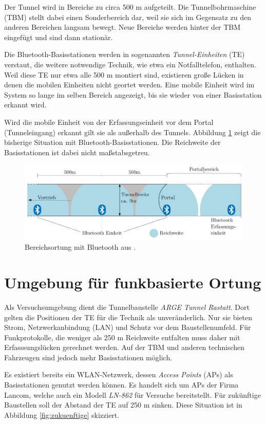 Der Tunnel wird in Bereiche zu circa 500 m aufgeteilt.
Die Tunnelbohrmaschine (TBM) stellt dabei einen Sonderbereich dar, weil sie sich im Gegensatz zu den anderen Bereichen langsam bewegt.
Neue Bereiche werden hinter der TBM eingefügt und sind dann stationär.

Die Bluetooth-Basisstationen werden in sogenannten \emph{Tunnel-Einheiten} (TE) verstaut, die weitere notwendige Technik, wie etwa ein Notfalltelefon, enthalten.
Weil diese TE nur etwa alle 500 m montiert sind, existieren große Lücken in denen die mobilen Einheiten nicht geortet werden.
Eine mobile Einheit wird im System so lange im selben Bereich angezeigt, bis sie wieder von einer Basisstation erkannt wird.

Wird die mobile Einheit von der Erfassungseinheit vor dem Portal (Tunneleingang) erkannt gilt sie als außerhalb des Tunnels.
Abbildung \ref{fig:bisherige} zeigt die bisherige Situation mit Bluetooth-Basisstationen.
Die Reichweite der Basisstationen ist dabei nicht maßstabsgetreu.

\begin{figure}[h]
  \centering
	\includegraphics[width=\textwidth]{images/bisherige.png}
  \caption{Bereichsortung mit Bluetooth aus \cite{maurer2016unterstuetzung}.}
  \label{fig:bisherige}
\end{figure}


\section{Umgebung für funkbasierte Ortung}
Als Versuchsumgebung dient die Tunnelbaustelle \emph{ARGE Tunnel Rastatt}.
Dort gelten die Positionen der TE für die Technik als unveränderlich.
Nur sie bieten Strom, Netzwerkanbindung (LAN) und Schutz vor dem Baustellenumfeld.
Für Funkprotokolle, die weniger als 250 m Reichweite entfalten muss daher mit Erfasssungslücken gerechnet werden.
Auf der TBM und anderen technischen Fahrzeugen sind jedoch mehr Basisstationen möglich.

Es existiert bereits ein WLAN-Netzwerk, dessen \emph{Access Points} (APs) als Basisstationen genutzt werden können.
Es handelt sich um APs der Firma Lancom, welche auch ein Modell \emph{LN-862} für Versuche bereitstellt.
Für zukünftige Baustellen soll der Abstand der TE auf 250 m sinken.
Diese Situation ist in Abbildung \ref{fig:zukuenftige} skizziert.

